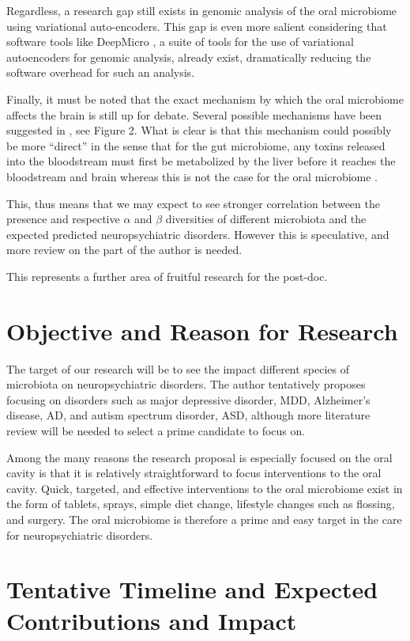 \documentclass{article}
\begin{document}
\begin{multicols}{2}
 Regardless, a research gap still exists in genomic analysis of the oral microbiome using variational auto-encoders. This gap is even more salient considering that software tools like DeepMicro \cite{oh_deepmicro_2020}, a suite of tools for the use of variational autoencoders for genomic analysis, already exist, dramatically reducing the software overhead for such an analysis.
 
 Finally, it must be noted that the exact mechanism by which the oral microbiome affects the brain is still up for debate. Several possible mechanisms have been suggested in \cite{tao_relationship_2024}, see Figure 2. What is clear is that this mechanism could possibly be more ``direct'' in the sense that for the gut microbiome, any toxins released into the bloodstream must first be metabolized by the liver before it reaches the bloodstream and brain \cite{REFISCH2023109568} whereas this is not the case for the oral microbiome \cite{tao_relationship_2024}. 
 
 This, thus means that we may expect to see stronger correlation between the presence and respective $\alpha$ and $\beta$ diversities of different microbiota and the expected predicted neuropsychiatric disorders. However this is speculative, and more review on the part of the author is needed.
 
 This represents a further area of fruitful research for the post-doc.
\section{Objective and Reason for Research}
The target of our research will be to see the impact different species of microbiota on neuropsychiatric disorders. The author tentatively proposes focusing on disorders such as major depressive disorder, MDD, Alzheimer's disease, AD, and autism spectrum disorder, ASD, although more literature review will be needed to select a prime candidate to focus on.

Among the many reasons the research proposal is especially focused on the oral cavity is that it is relatively straightforward to focus interventions to the oral cavity. Quick, targeted, and effective interventions to the oral microbiome exist in the form of tablets, sprays, simple diet change, lifestyle changes such as flossing, and surgery. The oral microbiome is therefore a prime and easy target in the care for neuropsychiatric disorders. 
\section{Tentative Timeline and Expected Contributions and Impact}



\end{multicols}
\end{document}
